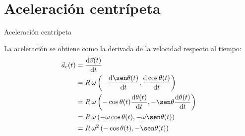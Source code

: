 \documentclass[11pt,handout,aspectratio=1610]{beamer}
\newcommand{\fdiff}[2]{\dfrac{\text{d} #1}{\text{d} #2}}
\begin{document}
\section{Aceleración centrípeta}

\begin{frame}{Aceleración centrípeta}

La aceleración se obtiene como la derivada de la velocidad respecto al tiempo: 
\begin{equation*}
    \begin{split}
        \vec{a}_{\text{c}} (t) &= \fdiff{\vec{v} (t)}{t} \\
                               &= R \, \omega \left(- \fdiff{\sen \theta (t)}{t}, \fdiff{\cos \theta (t)}{t}\right) \\
                               &= R \, \omega \left(- \cos \theta (t) \fdiff{\theta (t)}{t}, - \sen \theta \fdiff{\theta (t)}{t}\right) \\
                               &= R \, \omega \left(- \omega \cos \theta (t), - \omega \sen \theta (t) \right) \\
                               &= R \, \omega^2 \left(- \cos \theta (t), - \sen \theta (t) \right)
    \end{split}
\end{equation*}

\end{frame}
\end{document}
